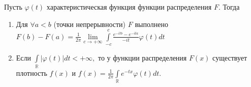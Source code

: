 	\begin{theorem}
		Пусть $\varphi(t)$ характеристическая функция функции распределения $F$. Тогда
		\begin{enumerate}
			\item Для $\forall a < b$ (точки непрерывности) $F$ выполнено
			$F(b) - F(a) = \frac{1}{2\pi} \lim\limits_{c \to +\infty} \int\limits_{-c}^{c} \frac{e^{-itb} - e^{-ita}}{-it}\varphi(t)dt$
			\item Если $\int\limits_\mathbb{R}|\varphi(t)|dt < +\infty,$ то у функции распределения $F(x)$ существует плотность $f(x)$ и $f(x) = \frac{1}{2\pi}\int\limits_\mathbb{R} e^{-tx}\varphi(t)dt.$
		\end{enumerate}
	\end{theorem}
	